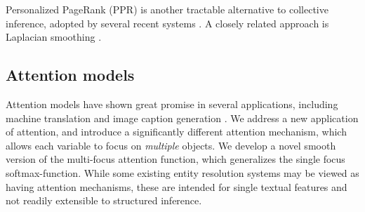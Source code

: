 Personalized PageRank (PPR) \cite{jeh2003scaling} is another tractable
alternative to collective inference, adopted by several recent systems
\cite{Han2011,He13,Alhelbawy14,Pershina2015}.  A closely related
approach is Laplacian smoothing \cite{Huang2014}.



\subsection{Attention models}

Attention models have shown great promise in several applications,
including machine translation \cite{bahdanau2014neural} and image
caption generation \cite{xu2015show}.  We address a new application of
attention, and introduce a significantly different attention
mechanism, which allows each variable to focus on \emph{multiple}
objects.  We develop a novel smooth version of the multi-focus
attention function, which generalizes the single focus
softmax-function.  While some existing entity resolution systems
\cite{Jin:2014,Lazic2015} may be viewed as having attention
mechanisms, these are intended for single textual features and not
readily extensible to structured inference.




